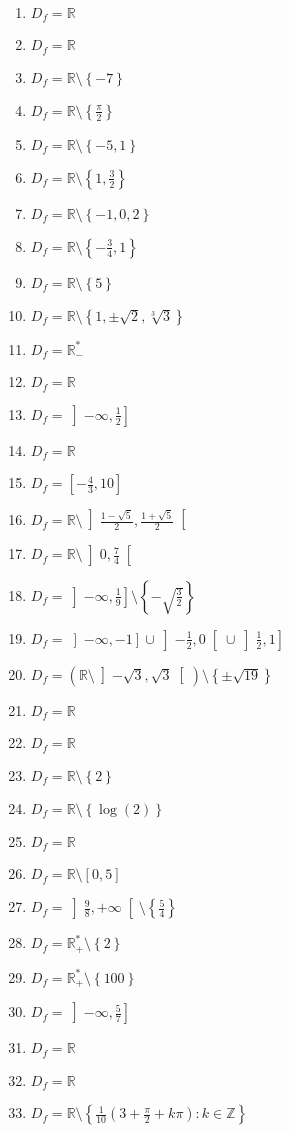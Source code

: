 \documentclass[a4paper,12pt]{article}
\newcommand{\minuss}[1]{\setminus\left\{#1\right\}}
\newcommand{\minusioo}[1]{\setminus\left\rbrack#1\right\lbrack}
\newcommand{\minusiff}[1]{\setminus\left\lbrack#1\right\rbrack}
\newcommand{\intoo}[1]{\left\rbrack#1\right\lbrack}
\newcommand{\intof}[1]{\left\rbrack#1\right\rbrack}
\newcommand{\intff}[1]{\left\lbrack#1\right\rbrack}
\begin{document}
\begin{multicols}{2}
\begin{enumerate}
\item $D_f=\mathbb{R}$
\item $D_f=\mathbb{R}$
\item $D_f=\mathbb{R}\minuss{-7}$
\item $D_f=\mathbb{R}\minuss{\frac{\pi}{2}}$
\item $D_f=\mathbb{R}\minuss{-5,1}$
\item $D_f=\mathbb{R}\minuss{1,\frac{3}{2}}$
\item $D_f=\mathbb{R}\minuss{-1,0,2}$
\item $D_f=\mathbb{R}\minuss{-\frac{3}{4},1}$
\item $D_f=\mathbb{R}\minuss{5}$
\item $D_f=\mathbb{R}\minuss{1,\pm\sqrt{2},\sqrt[3]{3}}$
\item $D_f=\mathbb{R_-^*}$
\item $D_f=\mathbb{R}$
\item $D_f=\intof{-\infty,\frac{1}{2}}$
\item $D_f=\mathbb{R}$
\item $D_f=\intff{-\frac{4}{3},10}$
\item $D_f=\mathbb{R}\minusioo{\frac{1-\sqrt{5}}{2},\frac{1+\sqrt{5}}{2}}$
\item $D_f=\mathbb{R}\minusioo{0,\frac{7}{4}}$
\item $D_f=\intof{-\infty,\frac{1}{9}}\minuss{-\sqrt{\frac{3}{2}}}$
\item $D_f=\intof{-\infty,-1}\cup\intoo{-\frac{1}{2},0}\cup\intof{\frac{1}{2},1}$
\item $D_f=\left(\mathbb{R}\minusioo{-\sqrt{3},\sqrt{3}}\right)\minuss{\pm\sqrt{19}}$
\item $D_f=\mathbb{R}$
\item $D_f=\mathbb{R}$
\item $D_f=\mathbb{R}\minuss{2}$
\item $D_f=\mathbb{R}\minuss{\log(2)}$
\item $D_f=\mathbb{R}$
\item $D_f=\mathbb{R}\minusiff{0,5}$
\item $D_f=\intoo{\frac{9}{8},+\infty}\minuss{\frac{5}{4}}$
\item $D_f=\mathbb{R_+^*}\minuss{2}$
\item $D_f=\mathbb{R_+^*}\minuss{100}$
\item $D_f=\intof{-\infty,\frac{5}{7}}$
\item $D_f=\mathbb{R}$
\item $D_f=\mathbb{R}$
\item $D_f=\mathbb{R}\minuss{\frac{1}{10}\left(3+\frac{\pi}{2}+k\pi\right) : k\in\mathbb{Z}}$

\end{enumerate}
\end{multicols}
\end{document}
